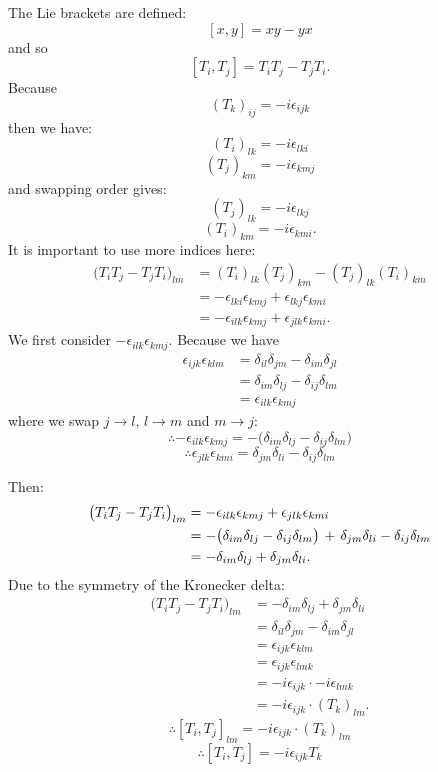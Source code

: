 \begin{enumerate}
    The Lie brackets are defined:
    $$[x,y]=xy-yx$$
    and so
    $$[T_i,T_j]
    =T_iT_j-T_jT_i.$$
    Because
    $$(T_k)_{ij}=-i\epsilon_{ijk}$$
    then we have:
    $$(T_i)_{lk}=-i\epsilon_{lki}$$
    $$(T_j)_{km}=-i\epsilon_{kmj}$$
    and swapping order gives:
    $$(T_j)_{lk}=-i\epsilon_{lkj}$$
    $$(T_i)_{km}=-i\epsilon_{kmi}.$$
    It is important to use more indices here:
    \begin{align*}
        \bigl(T_iT_j-T_jT_i\bigl)_{lm}
        &=(T_i)_{lk}(T_j)_{km}
        -(T_j)_{lk}(T_i)_{km} \\
        &=-\epsilon_{lki}\epsilon_{kmj}
        +\epsilon_{lkj}\epsilon_{kmi} \\
        &=-\epsilon_{ilk}\epsilon_{kmj}
        +\epsilon_{jlk}\epsilon_{kmi}.
    \end{align*}
    We first consider $-\epsilon_{ilk}\epsilon_{kmj}$. Because we have
    \begin{align*}
        \epsilon_{ijk}\epsilon_{klm}
        &=\delta_{il}\delta_{jm}-\delta_{im}\delta_{jl} \\
        &=\delta_{im}\delta_{lj}-\delta_{ij}\delta_{lm} \\
        &=\epsilon_{ilk}\epsilon_{kmj}
    \end{align*}
    where we swap $j\rightarrow l$, $l\rightarrow m$ and $m\rightarrow j$:
    $$\therefore-\epsilon_{ilk}\epsilon_{kmj}
    =-\bigl(\delta_{im}\delta_{lj}-\delta_{ij}\delta_{lm}\bigl)$$
    $$\therefore\epsilon_{jlk}\epsilon_{kmi}
    =\delta_{jm}\delta_{li}-\delta_{ij}\delta_{lm}$$

    \newpage

    Then:
    \begin{align*}
        \bigl(T_iT_j-T_jT_i\bigl)_{lm}
        &=-\epsilon_{ilk}\epsilon_{kmj}
        +\epsilon_{jlk}\epsilon_{kmi} \\
        &=-\bigl(\delta_{im}\delta_{lj}-\delta_{ij}\delta_{lm}\bigl)\hspace{0.05in}
        +\hspace{0.05in}\delta_{jm}\delta_{li}-\delta_{ij}\delta_{lm} \\
        &=-\delta_{im}\delta_{lj}+\delta_{jm}\delta_{li}.
    \end{align*}
    Due to the symmetry of the Kronecker delta:
    \begin{align*}
        \bigl(T_iT_j-T_jT_i\bigl)_{lm}
        &=-\delta_{im}\delta_{lj}+\delta_{jm}\delta_{li} \\
        &=\delta_{il}\delta_{jm}-\delta_{im}\delta_{jl} \\
        &=\epsilon_{ijk}\epsilon_{klm} \\
        &=\epsilon_{ijk}\epsilon_{lmk} \\
        &=-i\epsilon_{ijk}\cdot -i\epsilon_{lmk} \\
        &=-i\epsilon_{ijk}\cdot(T_k)_{lm}.
    \end{align*}
    $$\therefore [T_i,T_j]_{lm}=-i\epsilon_{ijk}\cdot(T_k)_{lm}$$
    $$\therefore [T_i,T_j]=-i\epsilon_{ijk}T_k$$
    

\end{enumerate}
